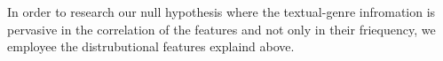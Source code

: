 \documentclass[runningheads]{llncs}
\begin{document}
In order to research our null hypothesis where the textual-genre infromation is pervasive in the correlation of the features and not only in their friequency, we employee the distrubutional features explaind above.


\hfill \break


%

\end{document}
